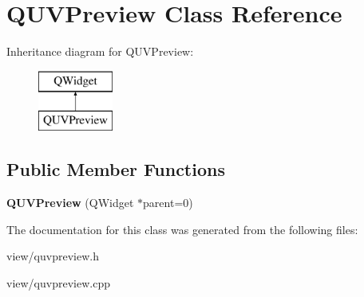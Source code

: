 \hypertarget{classQUVPreview}{\section{Q\+U\+V\+Preview Class Reference}
\label{classQUVPreview}
}
Inheritance diagram for Q\+U\+V\+Preview\+:\begin{figure}[H]
\begin{center}
\leavevmode
\includegraphics[height=2.000000cm]{classQUVPreview}
\end{center}
\end{figure}
\subsection*{Public Member Functions}
\begin{DoxyCompactItemize}
\item 
\hypertarget{classQUVPreview_af529e4c875911a5a652a306b41cda879}{{\bfseries Q\+U\+V\+Preview} (Q\+Widget $\ast$parent=0)}\label{classQUVPreview_af529e4c875911a5a652a306b41cda879}

\end{DoxyCompactItemize}


The documentation for this class was generated from the following files\+:\begin{DoxyCompactItemize}
\item 
view/quvpreview.\+h\item 
view/quvpreview.\+cpp\end{DoxyCompactItemize}
